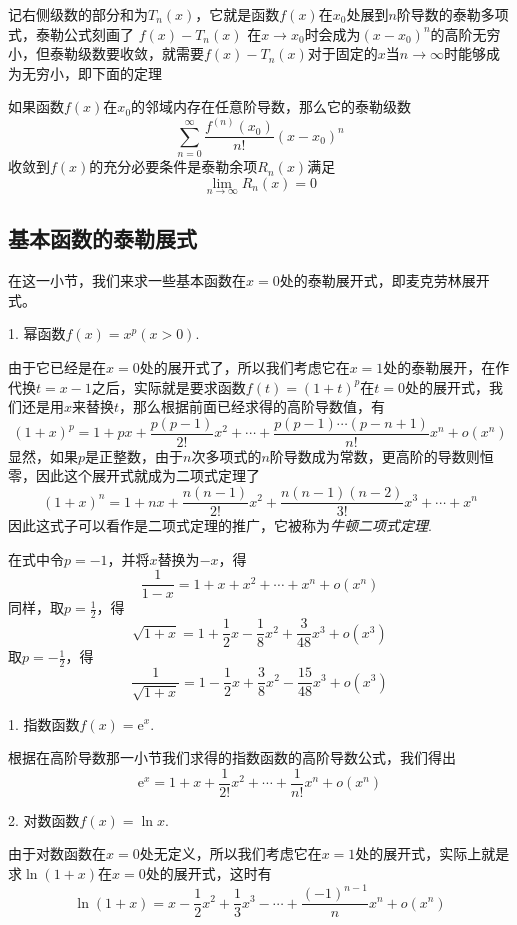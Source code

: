 记右侧级数的部分和为$T_n(x)$，它就是函数$f(x)$在$x_0$处展到$n$阶导数的泰勒多项式，泰勒公式刻画了 $f(x)-T_n(x)$ 在$x\to x_0$时会成为$(x-x_0)^n$的高阶无穷小，但泰勒级数要收敛，就需要$f(x)-T_n(x)$对于固定的$x$当$n\to\infty$时能够成为无穷小，即下面的定理
\begin{theorem}
  如果函数$f(x)$在$x_0$的邻域内存在任意阶导数，那么它的泰勒级数
  \[ \sum_{n=0}^{\infty} \frac{f^{(n)}(x_0)}{n!}(x-x_0)^n \]
  收敛到$f(x)$的充分必要条件是泰勒余项$R_n(x)$满足
  \[ \lim_{n \to \infty} R_n(x) = 0 \]
\end{theorem}

\subsection{基本函数的泰勒展式}
\label{sec:taylor-expand-for-fundation-function}

在这一小节，我们来求一些基本函数在$x=0$处的泰勒展开式，即麦克劳林展开式。

1. 幂函数$f(x)=x^p(x>0)$.

由于它已经是在$x=0$处的展开式了，所以我们考虑它在$x=1$处的泰勒展开，在作代换$t=x-1$之后，实际就是要求函数$f(t)=(1+t)^p$在$t=0$处的展开式，我们还是用$x$来替换$t$，那么根据前面已经求得的高阶导数值，有
\[ (1+x)^p = 1 + px + \frac{p(p-1)}{2!}x^2 + \cdots + \frac{p(p-1)\cdots (p-n+1)}{n!}x^n + o(x^n) \]
显然，如果$p$是正整数，由于$n$次多项式的$n$阶导数成为常数，更高阶的导数则恒零，因此这个展开式就成为二项式定理了
\[ (1+x)^n = 1+nx + \frac{n(n-1)}{2!}x^2 + \frac{n(n-1)(n-2)}{3!}x^3 + \cdots + x^n \]
因此这式子可以看作是二项式定理的推广，它被称为\emph{牛顿二项式定理}.

在式中令$p=-1$，并将$x$替换为$-x$，得
\[ \frac{1}{1-x} = 1+x+x^2 + \cdots + x^n + o(x^n) \]
同样，取$p=\frac{1}{2}$，得
\[ \sqrt{1+x} = 1+\frac{1}{2}x-\frac{1}{8}x^2+\frac{3}{48}x^3 + o(x^3) \]
取$p=-\frac{1}{2}$，得
\[ \frac{1}{\sqrt{1+x}} = 1-\frac{1}{2}x+\frac{3}{8}x^2 -\frac{15}{48}x^3 + o(x^3) \]

1. 指数函数$f(x)=\mathrm{e}^x$.

根据在高阶导数那一小节我们求得的指数函数的高阶导数公式，我们得出
\[ \mathrm{e}^x = 1+x+\frac{1}{2!}x^2 + \cdots + \frac{1}{n!}x^n + o(x^n) \]

2. 对数函数$f(x)=\ln{x}$.

由于对数函数在$x=0$处无定义，所以我们考虑它在$x=1$处的展开式，实际上就是求$\ln{(1+x)}$在$x=0$处的展开式，这时有
\[ \ln{(1+x)} = x - \frac{1}{2} x^2 + \frac{1}{3} x^3 - \cdots + \frac{(-1)^{n-1}}{n}x^n + o(x^n) \]

